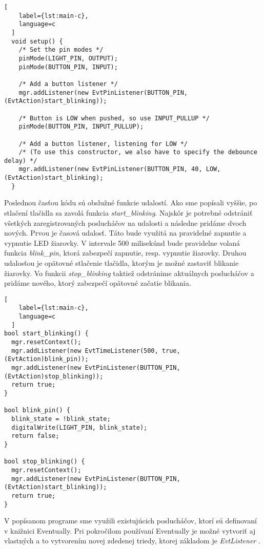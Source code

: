 \begin{lstlisting}[
    label={lst:main-c},
    language=c
  ]  
  void setup() {
    /* Set the pin modes */
    pinMode(LIGHT_PIN, OUTPUT);
    pinMode(BUTTON_PIN, INPUT);
  
    /* Add a button listener */
    mgr.addListener(new EvtPinListener(BUTTON_PIN, (EvtAction)start_blinking));

    /* Button is LOW when pushed, so use INPUT_PULLUP */
    pinMode(BUTTON_PIN, INPUT_PULLUP);

    /* Add a button listener, listening for LOW */
    /* (To use this constructor, we also have to specify the debounce delay) */
    mgr.addListener(new EvtPinListener(BUTTON_PIN, 40, LOW, (EvtAction)start_blinking);
  }
\end{lstlisting}

\par Poslednou časťou kódu sú obslužné funkcie udalostí. Ako sme popísali vyššie, po stlačení tlačidla sa zavolá funkcia \textit{start\_blinking}.
Najskôr je potrebné odstrániť všetkých zaregistrovaných poslucháčov na udalosti a následne pridáme dvoch nových. Prvou je časová udalosť.
Táto bude využitá na pravidelné zapnutie a vypnutie LED žiarovky.
V intervale 500 milisekúnd bude pravidelne volaná funkcia \textit{blink\_pin}, ktorá zabezpečí zapnutie, resp. vypnutie žiarovky.
Druhou udalosťou je opätovné stlačenie tlačidla, ktorým je možné zastaviť blikanie žiarovky. Vo funkcii \textit{stop\_blinking} taktiež odstránime aktuálnych poslucháčov a pridáme nového,
ktorý zabezpečí opätovné začatie blikania.

\begin{lstlisting}[
    label={lst:main-c},
    language=c
  ]
bool start_blinking() {
  mgr.resetContext(); 
  mgr.addListener(new EvtTimeListener(500, true, (EvtAction)blink_pin));
  mgr.addListener(new EvtPinListener(BUTTON_PIN, (EvtAction)stop_blinking));
  return true;
}

bool blink_pin() {
  blink_state = !blink_state;
  digitalWrite(LIGHT_PIN, blink_state);
  return false;
}
  
bool stop_blinking() {
  mgr.resetContext();
  mgr.addListener(new EvtPinListener(BUTTON_PIN, (EvtAction)start_blinking));
  return true;
}

\end{lstlisting}

\par V popísanom programe sme využili existujúcich poslucháčov, ktorí sú definovaní v knižnici Eventually.
Pri pokročilom používaní Eventually je možné vytvoriť aj vlastných a to vytvorením novej zdedenej triedy, ktorej základom je \textit{EvtListener} \cite{bartlettEventually2021}.

